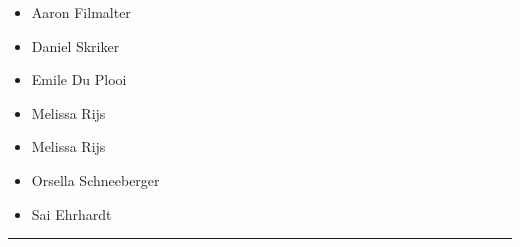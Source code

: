 \documentclass[10pt]{article}
\begin{document}
		

	\begin{multicols}{2}

		\begin{itemize}
									\item Aaron Filmalter
									\item Daniel Skriker
									\item Emile Du Plooi
									\item Melissa Rijs
						\end{itemize}

		\vfill\null
		\columnbreak

		\begin{itemize}
									\item Melissa Rijs
									\item Orsella Schneeberger
									\item Sai Ehrhardt
						\end{itemize}

		\vfill\null

		\end{multicols}



			\vspace{0.5cm}
	\hrule
	\vspace{0.5cm}
\end{document}
